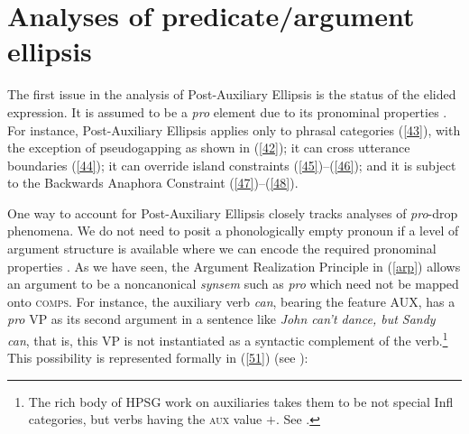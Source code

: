 \section{Analyses of predicate/argument ellipsis}
\label{sec-analyses-of-pred-ellipsis}

The first issue in the analysis of Post-Auxiliary Ellipsis is the status of the elided expression. It is assumed to be a
\textit{pro} element due to its pronominal properties \citep[see][]{Lobeck1995, Lopez2000, Kim2003,
  Aelbrecht2015, Ginzburg2018}. For instance, Post-Auxiliary Ellipsis applies only to phrasal categories (\ref{43}),
with the exception of pseudogapping as shown in (\ref{42}); it can cross utterance boundaries
(\ref{44}); it can override island constraints (\ref{45})--(\ref{46}); and it is subject to the
Backwards Anaphora Constraint (\ref{47})--(\ref{48}). 

\z
{}
\z
{}
\z
{}
\z
{}
\z
{}
\z
{}
\z

One way to account for Post-Auxiliary Ellipsis closely tracks analyses of \emph{pro}-drop phenomena. We do not need to posit a phonologically empty pronoun if a level of argument structure is
available where we can encode the required pronominal properties
\citep[see][330]{Ginzburg:Sag:2000}. As we have seen, the Argument Realization Principle in
(\ref{arp}) allows an argument to be a noncanonical  \emph{synsem}
such as \textit{pro} which need not be mapped onto \textsc{comps}. 
%
For instance, the auxiliary
verb \textit{can}, bearing the feature AUX, has a \textit{pro} VP as its second argument in a sentence like \textit{John can't dance, but Sandy can}, that is, this VP is not instantiated as a syntactic complement of the verb.\footnote{The rich body of HPSG work on  auxiliaries takes them to be not special Infl categories, but verbs having the \textsc{aux} value $+$. See \citet{Kim:00, KS2002a, Sag:Wasow:Bender:2003, Sag2020a, kimmichaelis:2020}.} This possibility is represented formally in (\ref{51}) 
(see \citealt{Kim2003, ginzburg-miller-ellipsis-handbook}):

